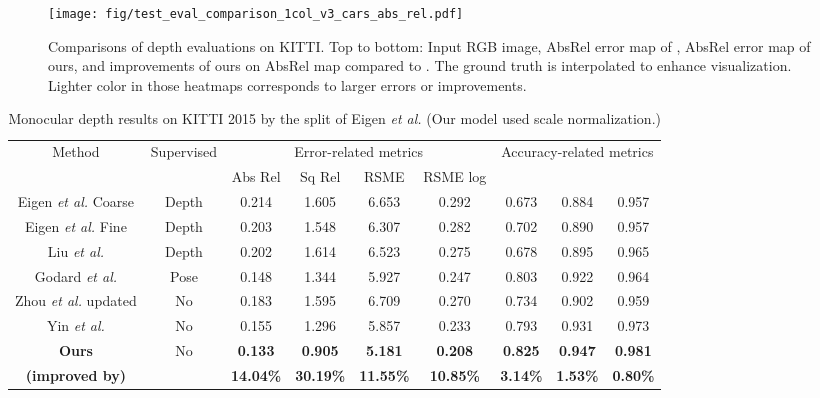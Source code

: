 \documentclass[10pt,twocolumn]{article}
\begin{document}
\begin{figure}[!htbp]
    \centering
    \texttt{[image: fig/test\_eval\_comparison\_1col\_v3\_cars\_abs\_rel.pdf]}
    \caption{Comparisons of depth evaluations on KITTI. Top to bottom: Input RGB image, AbsRel error map of \cite{yin2018geonet}, AbsRel error map of ours, and improvements of ours on AbsRel map compared to \cite{yin2018geonet}. The ground truth is interpolated to enhance visualization. Lighter color in those heatmaps corresponds to larger errors or improvements.}
    \label{fig:absrel_map}
\end{figure}

\begin{table*}[htbp]
\centering
\begin{tabular}{ c||c| c c c c|c c c  }
 \hline
  \multirow{2}{*}{Method} & \multirow{2}{*}{Supervised} & \multicolumn{4}{c|}{Error-related metrics} & \multicolumn{3}{c}{Accuracy-related metrics}\\
  &   & Abs Rel & Sq Rel & RSME & RSME log &  &  & \\
 \hline
 Eigen \textit{et al.} \cite{eigen2014depth} Coarse & Depth & 0.214 & 1.605 & 6.653 & 0.292 & 0.673 & 0.884 & 0.957 \\

  Eigen \textit{et al.} \cite{eigen2014depth} Fine & Depth & 0.203 & 1.548 & 6.307 & 0.282 & 0.702 & 0.890 & 0.957 \\

  Liu \textit{et al.}  \cite{liu2016learning} & Depth & 0.202 & 1.614 & 6.523 & 0.275 & 0.678 & 0.895 & 0.965 \\

  Godard \textit{et al.} \cite{godard2017unsupervised}  & Pose & 0.148 & 1.344 & 5.927 & 0.247 & 0.803 & 0.922 & 0.964 \\

  Zhou \textit{et al.} \cite{zhou2017unsupervised} updated & No & 0.183 & 1.595 & 6.709 & 0.270 & 0.734 & 0.902 & 0.959\\

  Yin \textit{et al.} \cite{yin2018geonet} & No & 0.155 & 1.296 & 5.857 & 0.233 & 0.793 & 0.931 & 0.973 \\

  \hline
  \textbf{Ours} & \multirow{2}{*}{No} & \textbf{0.133} &     \textbf{0.905} &     \textbf{5.181} &     \textbf{0.208} &     \textbf{0.825} &     \textbf{0.947} &     \textbf{0.981}\\
      \textbf{(improved by)}&   & \textbf{14.04\%} &     \textbf{30.19\%} &     \textbf{11.55\%} &    \textbf{10.85\%}  &     \textbf{3.14\%} &     \textbf{1.53\%} &     \textbf{0.80\%} \\
 \hline
\end{tabular}
\caption{Monocular depth results on KITTI 2015 \cite{menze2015object} by the split of Eigen
\textit{et al.} \cite{eigen2014depth} (Our model used scale normalization.)}\label{tab:depth_pred}
\end{table*}
\end{document}
